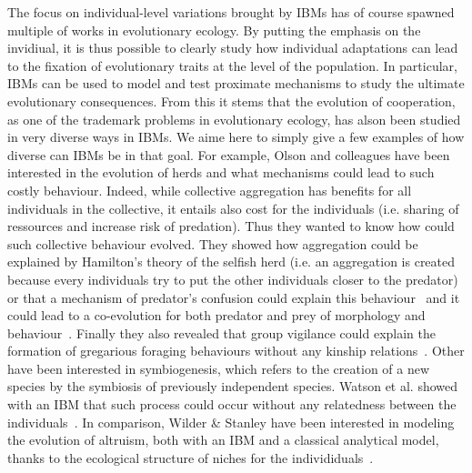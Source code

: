     The focus on individual-level variations brought by IBMs has of course spawned multiple of works in evolutionary ecology. By putting the emphasis on the invidiual, it is thus possible to clearly study how individual adaptations can lead to the fixation of evolutionary traits at the level of the population. In particular, IBMs can be used to model and test proximate mechanisms to study the ultimate evolutionary consequences. From this it stems that the evolution of cooperation, as one of the trademark problems in evolutionary ecology, has alson been studied in very diverse ways in IBMs. We aime here to simply give a few examples of how diverse can IBMs be in that goal. For example, Olson and colleagues have been interested in the evolution of herds and what mechanisms could lead to such costly behaviour. Indeed, while collective aggregation has benefits for all individuals in the collective, it entails also cost for the individuals (i.e. sharing of ressources and increase risk of predation). Thus they wanted to know how could such collective behaviour evolved. They showed how aggregation could be explained by Hamilton's theory of the selfish herd (i.e. an aggregation is created because every individuals try to put the other individuals closer to the predator)~\cite{Olson2013a} or that a mechanism of predator's confusion could explain this behaviour~\cite{Olson2013} and it could lead to a co-evolution for both predator and prey of morphology and behaviour~\cite{Olson2016}. Finally they also revealed that group vigilance could explain the formation of gregarious foraging behaviours without any kinship relations~\cite{Haley2014, Olson2014}. Other have been interested in symbiogenesis, which refers to the creation of a new species by the symbiosis of previously independent species. Watson et al. showed with an IBM that such process could occur without any relatedness between the individuals~\cite{Watson1992}. In comparison, Wilder & Stanley have been interested in modeling the evolution of altruism, both with an IBM and a classical analytical model, thanks to the ecological structure of niches for the individiduals~\cite{Wilder2015}.


